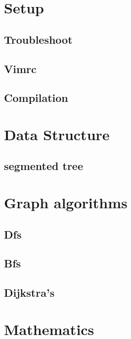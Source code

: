 \section{Setup}
\subsection{Troubleshoot}
\raggedbottom
\hrulefill
\subsection{Vimrc}
\raggedbottom
\hrulefill
\subsection{Compilation}
\raggedbottom
\hrulefill


\section{Data Structure}
\subsection{segmented tree}
\raggedbottom
\hrulefill

\section{Graph algorithms}
\subsection{Dfs}
\raggedbottom
\hrulefill
\subsection{Bfs}
\raggedbottom
\hrulefill
\subsection{Dijkstra's}
\raggedbottom
\hrulefill

\section{Mathematics}
